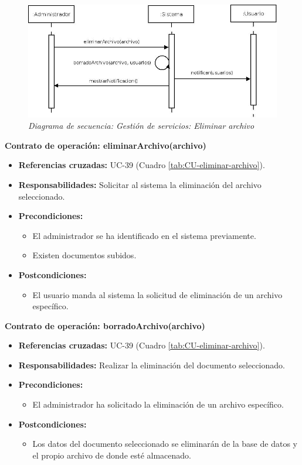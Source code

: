 \begin{figure}
\centering
  \includegraphics[scale=.50]{img/secuencias/gestion-servicios-eliminar-archivo.jpeg}
  \caption{\textit{Diagrama de secuencia: Gestión de servicios: Eliminar archivo}}
  \label{fig:secuencia-gestion-servicios-eliminar-archivo}
\end{figure}

\textbf{Contrato de operación: eliminarArchivo(archivo)}
\begin{itemize}
\item \textbf{Referencias cruzadas:} UC-39 (Cuadro \ref{tab:CU-eliminar-archivo}).
\item \textbf{Responsabilidades:} Solicitar al sistema la eliminación del archivo seleccionado.
\item \textbf{Precondiciones:} 
 \begin{itemize}
\item El administrador se ha identificado en el sistema previamente.
\item Existen documentos subidos.
\end {itemize}
\item \textbf{Postcondiciones:} 
 \begin{itemize}
\item El usuario manda al sistema la solicitud de eliminación de un archivo específico.
\end {itemize}
\end {itemize}

\textbf{Contrato de operación: borradoArchivo(archivo)}
\begin{itemize}
\item \textbf{Referencias cruzadas:} UC-39 (Cuadro \ref{tab:CU-eliminar-archivo}).
\item \textbf{Responsabilidades:} Realizar la eliminación del documento seleccionado.
\item \textbf{Precondiciones:} 
 \begin{itemize}
\item El administrador ha solicitado la eliminación de un archivo específico.
\end {itemize}
\item \textbf{Postcondiciones:} 
 \begin{itemize}
\item Los datos del documento seleccionado se eliminarán de la base de datos y el propio archivo de donde esté almacenado.
\end {itemize}
\end {itemize}

